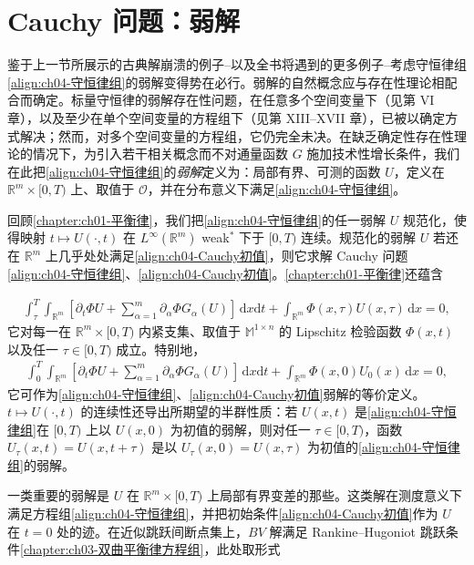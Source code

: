 \documentclass[../../main.tex]{subfiles}
\begin{document}
\section{Cauchy 问题：弱解}\label{section:ch04-弱解}

鉴于上一节所展示的古典解崩溃的例子--以及全书将遇到的更多例子--考虑守恒律组\eqref{align:ch04-守恒律组}的弱解变得势在必行。弱解的自然概念应与存在性理论相配合而确定。标量守恒律的弱解存在性问题，在任意多个空间变量下（见第 VI 章），以及至少在单个空间变量的方程组下（见第 XIII--XVII 章），已被以确定方式解决；然而，对多个空间变量的方程组，它仍完全未决。在缺乏确定性存在性理论的情况下，为引入若干相关概念而不对通量函数 $G$ 施加技术性增长条件，我们在此把\eqref{align:ch04-守恒律组}的\emph{弱解}定义为：局部有界、可测的函数 $U$，定义在 $\mathbb{R}^{m}\times[0,T)$ 上、取值于 $\mathcal{O}$，并在分布意义下满足\eqref{align:ch04-守恒律组}。

回顾\cref{chapter:ch01-平衡律}，我们把\eqref{align:ch04-守恒律组}的任一弱解 $U$ 规范化，使得映射 $t\mapsto U(\cdot,t)$ 在 $L^{\infty}(\mathbb{R}^{m})$ weak$^{*}$ 下于 $[0,T)$ 连续。规范化的弱解 $U$ 若还在 $\mathbb{R}^{m}$ 上几乎处处满足\eqref{align:ch04-Cauchy初值}，则它求解 Cauchy 问题\eqref{align:ch04-守恒律组}、\eqref{align:ch04-Cauchy初值}。\cref{chapter:ch01-平衡律}还蕴含

\begin{align}
\int_{\tau}^{T}\int_{\mathbb{R}^{m}}\left[\partial_{t}\Phi U+\sum_{\alpha=1}^{m}\partial_{\alpha}\Phi G_{\alpha}(U)\right]\,\mathrm{d}x\mathrm{d}t+\int_{\mathbb{R}^{m}}\Phi(x,\tau)U(x,\tau)\,\mathrm{d}x=0,
\label{align:ch04-弱解tau}
\end{align}
它对每一在 $\mathbb{R}^{m}\times[0,T)$ 内紧支集、取值于 $\mathbb{M}^{1\times n}$ 的 Lipschitz 检验函数 $\Phi(x,t)$ 以及任一 $\tau\in[0,T)$ 成立。特别地，
\begin{align}
\int_{0}^{T}\int_{\mathbb{R}^{m}}\left[\partial_{t}\Phi U+\sum_{\alpha=1}^{m}\partial_{\alpha}\Phi G_{\alpha}(U)\right]\,\mathrm{d}x\mathrm{d}t+\int_{\mathbb{R}^{m}}\Phi(x,0)U_{0}(x)\,\mathrm{d}x=0,
\label{align:ch04-弱解0}
\end{align}
它可作为\eqref{align:ch04-守恒律组}、\eqref{align:ch04-Cauchy初值}弱解的等价定义。$t\mapsto U(\cdot,t)$ 的连续性还导出所期望的半群性质：若 $U(x,t)$ 是\eqref{align:ch04-守恒律组}在 $[0,T)$ 上以 $U(x,0)$ 为初值的弱解，则对任一 $\tau\in[0,T)$，函数 $U_{\tau}(x,t)=U(x,t+\tau)$ 是以 $U_{\tau}(x,0)=U(x,\tau)$ 为初值的\eqref{align:ch04-守恒律组}的弱解。

一类重要的弱解是 $U$ 在 $\mathbb{R}^{m}\times[0,T)$ 上局部有界变差的那些。这类解在测度意义下满足方程组\eqref{align:ch04-守恒律组}，并把初始条件\eqref{align:ch04-Cauchy初值}作为 $U$ 在 $t=0$ 处的迹。在近似跳跃间断点集上，$BV$ 解满足 Rankine--Hugoniot 跳跃条件\cref{chapter:ch03-双曲平衡律方程组}，此处取形式
\end{document}
